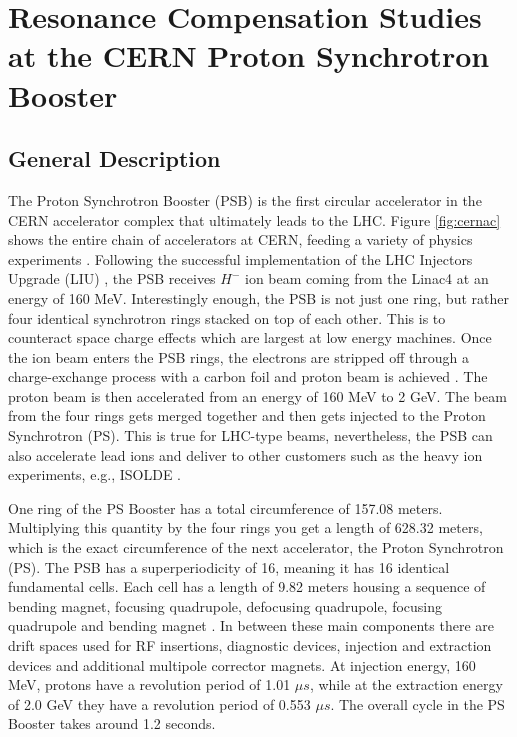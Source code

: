 \chapter{Resonance Compensation Studies at the CERN Proton Synchrotron Booster}
\label{sec:ch5}

\section{General Description}
The Proton Synchrotron Booster (PSB) is the first circular accelerator in the CERN accelerator complex that ultimately leads to the LHC. Figure \ref{fig:cernac} shows the entire chain of accelerators at CERN, feeding a variety of physics experiments \cite{cernplot}. Following the successful implementation of the LHC Injectors Upgrade (LIU) \cite{liu}, the PSB receives $H^-$ ion beam coming from the Linac4 at an energy of 160 MeV. Interestingly enough, the PSB is not just one ring, but rather four identical synchrotron rings stacked on top of each other. This is to counteract space charge effects which are largest at low energy machines. Once the ion beam enters the PSB rings, the electrons are stripped off through a charge-exchange process with a carbon foil and proton beam is achieved \cite{psbstrip}. The proton beam is then accelerated from an energy of 160 MeV to 2 GeV. The beam from the four rings gets merged together and then gets injected to the Proton Synchrotron (PS). This is true for LHC-type beams, nevertheless, the PSB can also accelerate lead ions and deliver to other customers such as the heavy ion experiments, e.g., ISOLDE \cite{foteini1}.   

One ring of the PS Booster has a total circumference of 157.08 meters. Multiplying this quantity by the four rings you get a length of 628.32 meters, which is the exact circumference of the next accelerator, the Proton Synchrotron (PS). The PSB has a superperiodicity of 16, meaning it has 16 identical fundamental cells. Each cell has a length of 9.82 meters housing a sequence of bending magnet, focusing quadrupole, defocusing quadrupole, focusing quadrupole and bending magnet \cite{tirsithesis}. In between these main components there are drift spaces used for RF insertions, diagnostic devices, injection and extraction devices and additional multipole corrector magnets. At injection energy, 160 MeV, protons have a revolution period of 1.01 $\mu s$, while at the extraction energy of 2.0 GeV they have a revolution period of 0.553 $\mu s$. The overall cycle in the PS Booster takes around 1.2 seconds. 


